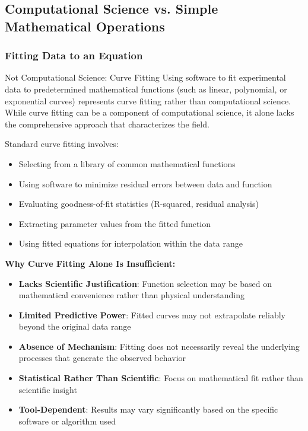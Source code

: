 \subsection{Computational Science vs. Simple Mathematical Operations}

\subsubsection{Fitting Data to an Equation}

\begin{conceptcard}{Not Computational Science: Curve Fitting}
Using software to fit experimental data to predetermined mathematical functions (such as linear, polynomial, or exponential curves) represents curve fitting rather than computational science. While curve fitting can be a component of computational science, it alone lacks the comprehensive approach that characterizes the field.
\end{conceptcard}

Standard curve fitting involves:
\begin{itemize}
    \item Selecting from a library of common mathematical functions
    \item Using software to minimize residual errors between data and function
    \item Evaluating goodness-of-fit statistics (R-squared, residual analysis)
    \item Extracting parameter values from the fitted function
    \item Using fitted equations for interpolation within the data range
\end{itemize}

\textbf{Why Curve Fitting Alone Is Insufficient:}
\begin{itemize}
    \item \textbf{Lacks Scientific Justification}: Function selection may be based on mathematical convenience rather than physical understanding
    \item \textbf{Limited Predictive Power}: Fitted curves may not extrapolate reliably beyond the original data range
    \item \textbf{Absence of Mechanism}: Fitting does not necessarily reveal the underlying processes that generate the observed behavior
    \item \textbf{Statistical Rather Than Scientific}: Focus on mathematical fit rather than scientific insight
    \item \textbf{Tool-Dependent}: Results may vary significantly based on the specific software or algorithm used
\end{itemize}

